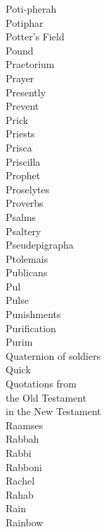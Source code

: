 Poti-pherah  \\
Potiphar  \\
Potter’s Field  \\
Pound  \\
Praetorium  \\
Prayer  \\
Presently  \\
Prevent  \\
Prick  \\
Priests  \\
Prisca  \\
Priscilla  \\
Prophet  \\
Proselytes  \\
Proverbs  \\
Psalms  \\
Psaltery  \\
Pseudepigrapha  \\
Ptolemais  \\
Publicans  \\
Pul  \\
Pulse  \\
Punishments  \\
Purification  \\
Purim  \\
Quaternion of soldiers  \\
Quick  \\
Quotations from\\
 the Old Testament\\
 in the New Testament  \\
Raamses  \\
Rabbah  \\
Rabbi  \\
Rabboni  \\
Rachel  \\
Rahab  \\
Rain  \\
Rainbow  \\
